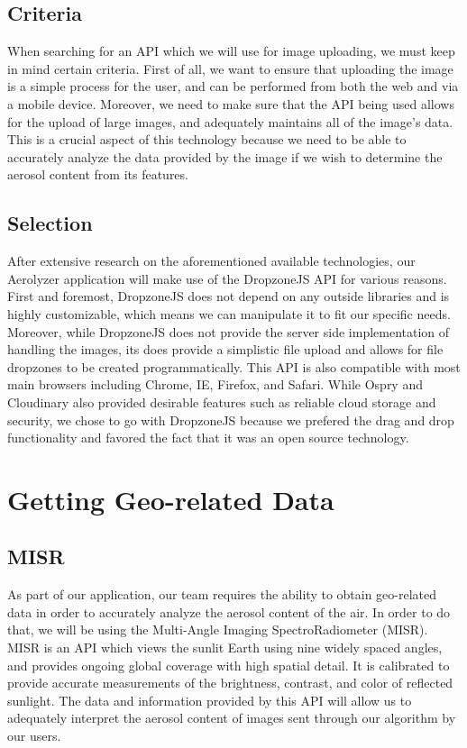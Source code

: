 \documentclass[onecolumn, draftclsnofoot,10pt, compsoc]{IEEEtran}
\begin{document}
\begin{flushleft}
\subsection{Criteria}
When searching for an API which we will use for image uploading, we must keep in mind certain criteria. First of all, we want to ensure that uploading the image is a simple process for the user, and can be performed from both the web and via a mobile device. Moreover, we need to make sure that the API being used allows for the upload of large images, and adequately maintains all of the image's data. This is a crucial aspect of this technology because we need to be able to accurately analyze the data provided by the image if we wish to determine the aerosol content from its features.
\subsection{Selection}
After extensive research on the aforementioned available technologies, our Aerolyzer application will make use of the DropzoneJS API for various reasons. First and foremost, DropzoneJS does not depend on any outside libraries and is highly customizable, which means we can manipulate it to fit our specific needs. Moreover, while DropzoneJS does not provide the server side implementation of handling the images, its does provide a simplistic file upload and allows for file dropzones to be created programmatically. This API is also compatible with most main browsers including Chrome, IE, Firefox, and Safari\cite{14}. While Ospry and Cloudinary also provided desirable features such as reliable cloud storage and security, we chose to go with DropzoneJS because we prefered the drag and drop functionality and favored the fact that it was an open source technology. 


\section{Getting Geo-related Data}
\subsection{MISR}
As part of our application, our team requires the ability to obtain geo-related data in order to accurately analyze the aerosol content of the air. In order to do that, we will be using the Multi-Angle Imaging SpectroRadiometer (MISR). MISR is an API which views the sunlit Earth using nine widely spaced angles, and provides ongoing global coverage with high spatial detail. It is calibrated to provide accurate measurements of the brightness, contrast, and color of reflected sunlight\cite{20}. The data and information provided by this API will allow us to adequately interpret the aerosol content of images sent through our algorithm by our users.

\end{flushleft}
\end{document}
